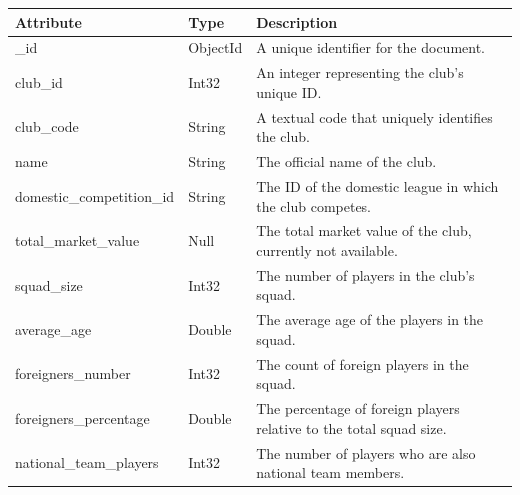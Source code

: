 \documentclass{Configuration_Files/PoliMi3i_thesis}
\begin{document}
    \begin{tabular}{|l|l|p{8cm}|}
    \hline
    \rowcolor{bluepoli!40}
    \textbf{Attribute}              & \textbf{Type}           & \textbf{Description}                                                                 \\ \hline
    \_id                            & ObjectId                & A unique identifier for the document.                                                               \\ \hline
    club\_id                        & Int32                   & An integer representing the club's unique ID.                                                      \\ \hline
    club\_code                      & String                  & A textual code that uniquely identifies the club.                                                  \\ \hline
    name                            & String                  & The official name of the club.                                                                     \\ \hline
    domestic\_competition\_id       & String                  & The ID of the domestic league in which the club competes.                                           \\ \hline
    total\_market\_value            & Null                    & The total market value of the club, currently not available.                                        \\ \hline
    squad\_size                     & Int32                   & The number of players in the club's squad.                                                         \\ \hline
    average\_age                    & Double                  & The average age of the players in the squad.                                                       \\ \hline
    foreigners\_number              & Int32                   & The count of foreign players in the squad.                                                         \\ \hline
    foreigners\_percentage          & Double                  & The percentage of foreign players relative to the total squad size.                                \\ \hline
    national\_team\_players         & Int32                   & The number of players who are also national team members.                                          \\ \hline

\end{tabular}
\end{document}
